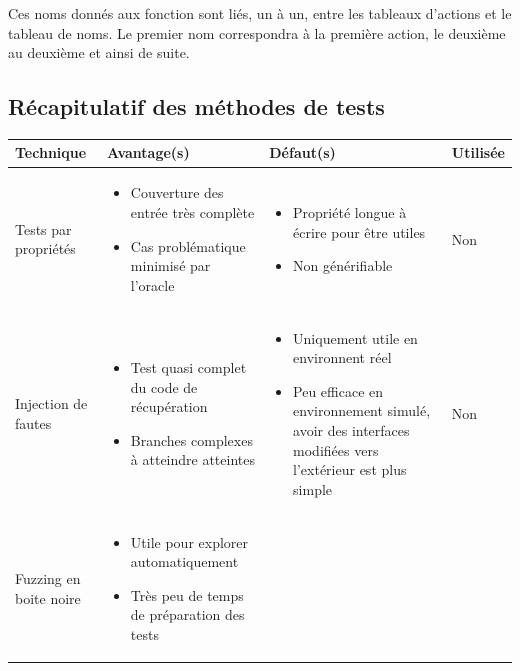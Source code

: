 \documentclass[a4paper]{report}
\begin{document}
Ces noms donnés aux fonction sont liés, un à un, entre les tableaux d'actions et le tableau de noms.
Le premier nom correspondra à la première action, le deuxième au deuxième et ainsi de suite.


\begin{landscape}
	\section{Récapitulatif des méthodes de tests}
	\begin{tabularx}{1\linewidth}{>{\centering}p{}||p{}|p{}|p{}}
	Technique & Avantage(s) & Défaut(s) & 
	Utilisée  \\
	\hline 
	\hline   
	Tests par propriétés & 
	\begin{itemize}
	\item Couverture des entrée très complète
	\item Cas problématique minimisé par l'oracle
	\end{itemize}
	 &
	\begin{itemize}
	\item Propriété longue à écrire pour être utiles
	\item Non générifiable
	\end{itemize}
	 & Non \\ 
	\hline   
	Injection de fautes &
	\begin{itemize}
	\item Test quasi complet du code de récupération
	\item Branches complexes à atteindre atteintes
	\end{itemize}
	 &
	\begin{itemize}
	\item Uniquement utile en environnent réel
	\item Peu efficace en environnement simulé, avoir des interfaces modifiées vers l'extérieur est plus simple
	\end{itemize}
	 & Non \\ 
	\hline   
	Fuzzing en boite noire &
	\begin{itemize}
	\item Utile pour explorer  automatiquement
	\item Très peu de temps de préparation des tests
	\end{itemize}

\end{tabularx}
\end{landscape}
\end{document}
